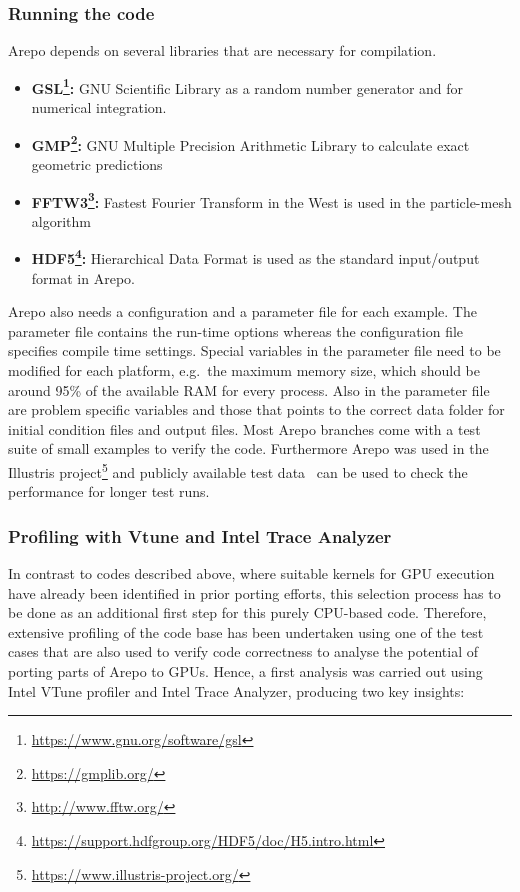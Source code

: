 \documentclass[../main]{subfiles}
\begin{document}
\subsubsection{Running the code}
Arepo depends on several libraries that are necessary for compilation.
\begin{itemize}[leftmargin=*]
	\item{\textbf{GSL\footnote{\url{https://www.gnu.org/software/gsl}}:}} GNU Scientific Library as a random number generator and for numerical integration.
	\item{\textbf{GMP\footnote{\url{https://gmplib.org/}}:}} GNU Multiple Precision Arithmetic Library to calculate exact geometric predictions
	\item{\textbf{FFTW3\footnote{\url{http://www.fftw.org/}}:}} Fastest Fourier Transform in the West is used in the particle-mesh algorithm
	\item{\textbf{HDF5\footnote{\url{https://support.hdfgroup.org/HDF5/doc/H5.intro.html}}:}} Hierarchical Data Format is used as the standard input/output format in Arepo.
\end{itemize}
Arepo also needs a configuration and a parameter file for each example.
The parameter file contains the run-time options whereas the configuration file specifies compile time settings.
Special variables in the parameter file need to be modified for each platform, e.g.\ the maximum memory size, which should be around 95\% of the available RAM for every process. Also in the parameter file are problem specific variables and those that points to the correct data folder for initial condition files and output files.
Most Arepo branches come with a test suite of small examples to verify the code.
Furthermore Arepo was used in the Illustris project\footnote{\url{https://www.illustris-project.org/}} and publicly available test data~\cite{Nelson_2015} can be used to check the performance for longer test runs.

\subsubsection{Profiling with Vtune and Intel Trace Analyzer}
In contrast to codes described above, where suitable kernels for GPU execution have already been identified in prior porting efforts, this selection process has to be done as an additional first step for this purely CPU-based code.
Therefore, extensive profiling of the code base has been undertaken using one of the test cases that are also used to verify code correctness to analyse the potential of porting parts of Arepo to GPUs.
Hence, a first analysis was carried out using Intel VTune profiler and Intel Trace Analyzer, producing two key insights:
\end{document}
